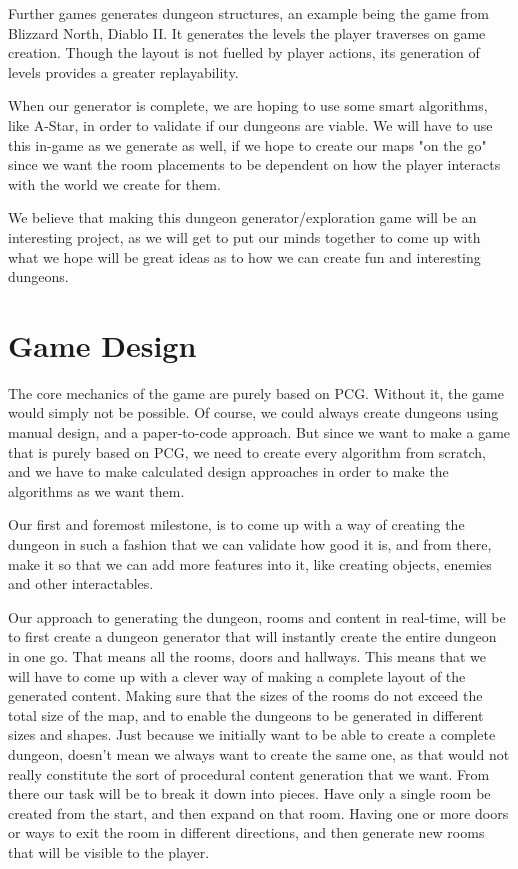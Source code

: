 \documentclass[conference,compsoc]{IEEEtran}
\begin{document}
Further games generates dungeon structures, an example being the game from Blizzard North, Diablo II\cite{Diablo2}. It generates the levels the player traverses on game creation. Though the layout is not fuelled by player actions, its generation of levels provides a greater replayability. 

When our generator is complete, we are hoping to use some smart algorithms, like A-Star, in order to validate if our dungeons are viable. We will have to use this in-game as we generate as well, if we hope to create our maps "on the go" since we want the room placements to be dependent on how the player interacts with the world we create for them.

We believe that making this dungeon generator/exploration game will be an interesting project, as we will get to put our minds together to come up with what we hope will be great ideas as to how we can create fun and interesting dungeons. 

\section{Game Design}
The core mechanics of the game are purely based on PCG. Without it, the game would simply not be possible. Of course, we could always create dungeons using manual design, and a paper-to-code approach. But since we want to make a game that is purely based on PCG, we need to create every algorithm from scratch, and we have to make calculated design approaches in order to make the algorithms as we want them.

Our first and foremost milestone, is to come up with a way of creating the dungeon in such a fashion that we can validate how good it is, and from there, make it so that we can add more features into it, like creating objects, enemies and other interactables. 

Our approach to generating the dungeon, rooms and content in real-time, will be to first create a dungeon generator that will instantly create the entire dungeon in one go. That means all the rooms, doors and hallways. This means that we will have to come up with a clever way of making a complete layout of the generated content. Making sure that the sizes of the rooms do not exceed the total size of the map, and to enable the dungeons to be generated in different sizes and shapes. Just because we initially want to be able to create a complete dungeon, doesn't mean we always want to create the same one, as that would not really constitute the sort of procedural content generation that we want. 
From there our task will be to break it down into pieces. Have only a single room be created from the start, and then expand on that room. Having one or more doors or ways to exit the room in different directions, and then generate new rooms that will be visible to the player.
\end{document}
